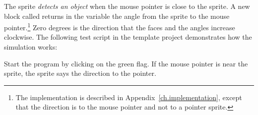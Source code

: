 The  sprite \emph{detects an object} when the mouse pointer is
close to the sprite. A new block called 
returns in the variable  the angle from the
sprite to the mouse pointer.\footnote{The implementation is described in
Appendix~\ref{ch.implementation}, except that the direction is to the
mouse pointer and not to a pointer sprite.} Zero degrees is the
direction that the  faces and the angles increase clockwise.
The following test script in the template project demonstrates how the
simulation works:


Start the program by clicking on the green flag. If the mouse pointer is
near the  sprite, the sprite says the direction to the
pointer.

\newpage



